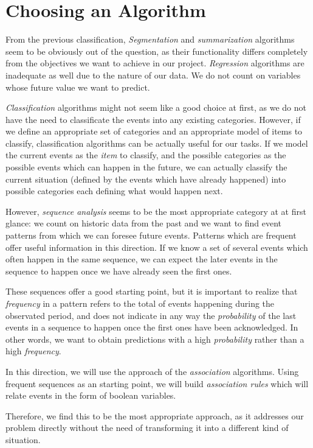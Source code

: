 \section{Choosing an Algorithm}
\label{sec:algorithms}
From the previous classification, \emph{Segmentation} and \emph{summarization} algorithms seem to be obviously out of the question, as their functionality differs completely from the objectives we want to achieve in our project. \emph{Regression} algorithms are inadequate as well due to the nature of our data. We do not count on variables whose future value we want to predict.

\emph{Classification} algorithms might not seem like a good choice at first, as we do not have the need to classificate the events into any existing categories. However, if we define an appropriate set of categories and an appropriate model of items to classify, classification algorithms can be actually useful for our tasks. If we model the current events as the \emph{item} to classify, and the possible categories as the possible events which can happen in the future, we can actually classify the current situation (defined by the events which have already happened) into possible categories each defining what would happen next.

However, \emph{sequence analysis} seems to be the most appropriate category at at first glance: we count on historic data from the past and we want to find event patterns from which we can foresee future events. Patterns which are frequent offer useful information in this direction. If we know a set of several events which often happen in the same sequence, we can expect the later events in the sequence to happen once we have already seen the first ones.

These sequences offer a good starting point, but it is important to realize that \emph{frequency} in a pattern refers to the total of events happening during the observated period, and does not indicate in any way the \emph{probability} of the last events in a sequence to happen once the first ones have been acknowledged. In other words, we want to obtain predictions with a high \emph{probability} rather than a high \emph{frequency}.

In this direction, we will use the approach of the \emph{association} algorithms. Using frequent sequences as an starting point, we will build \emph{association rules} which will relate events in the form of boolean variables.

Therefore, we find this to be the most appropriate approach, as it addresses our problem directly without the need of transforming it into a different kind of situation.



